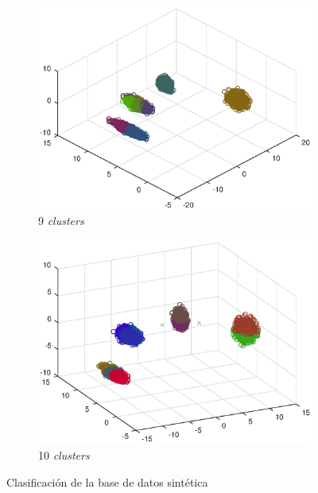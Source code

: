 \documentclass[11pt]{article} %
\begin{document}
\begin{figure}
\begin{subfigure}[b]{0.435\textwidth}
        \includegraphics[width=\textwidth]{../src/fig/21_9_clusters.eps}
        \caption[]{9 \emph{clusters}}
        \label{fig:21:9c}
    \end{subfigure}
    \quad
    \begin{subfigure}[b]{0.435\textwidth}
        \includegraphics[width=\textwidth]{../src/fig/21_10_clusters.eps}
        \caption[]{10 \emph{clusters}}
        \label{fig:21:10c}
    \end{subfigure}
    \caption{Clasificación de la base de datos sintética}
    \label{fig:21:clusters}
\end{figure}
\end{document}
